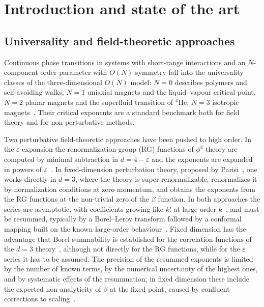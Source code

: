 \section{Introduction and state of the art}
\label{sec:intro}

\subsection{Universality and field-theoretic approaches}
\label{sec:intro-universality}

Continuous phase transitions in systems with short-range interactions and an $N$-component order parameter with
$O(N)$ symmetry fall into the universality classes of the three-dimensional $O(N)$ model: $N=0$ describes polymers
and self-avoiding walks, $N=1$ uniaxial magnets and the liquid--vapour critical point, $N=2$ planar magnets and the
superfluid transition of $^4$He, $N=3$ isotropic magnets~\cite{PelissettoVicari2002,ZinnJustinBook}. Their critical
exponents are a standard benchmark both for field theory and for non-perturbative methods.

Two perturbative field-theoretic approaches have been pushed to high order. In the $\varepsilon$ expansion the
renormalization-group (RG) functions of $\phi^4$ theory are computed by minimal subtraction in $d=4-\varepsilon$ and
the exponents are expanded in powers of $\varepsilon$~\cite{ZinnJustinBook,KleinertBook}. In fixed-dimension
perturbation theory, proposed by Parisi~\cite{Parisi1980}, one works directly in $d=3$, where the theory is
super-renormalizable, renormalizes it by normalization conditions at zero momentum, and obtains the exponents from
the RG functions at the non-trivial zero of the $\beta$ function. In both approaches the series are asymptotic, with
coefficients growing like $k!$ at large order $k$~\cite{Lipatov1977,BrezinLeGuillouZinnJustin1977}, and must be
resummed, typically by a Borel--Leroy transform followed by a conformal mapping built on the known large-order
behaviour~\cite{LeGuillouZinnJustin1977,LeGuillouZinnJustin1980,GuidaZinnJustin1998}. Fixed dimension has the
advantage that Borel summability is established for the correlation functions of the $d=3$ theory~\cite{MagnenSeneor1977}, although not directly for
the RG functions, while for the $\varepsilon$ series it has to be assumed. The precision of the resummed exponents is limited by the number of known terms, by the
numerical uncertainty of the highest ones, and by systematic effects of the resummation; in fixed dimension these
include the expected non-analyticity of $\beta$ at the fixed point, caused by confluent corrections to
scaling~\cite{Nickel1991,PelissettoVicari2002}.

